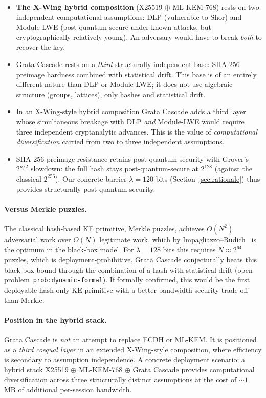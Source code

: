 \documentclass[11pt,a4paper]{article}
\begin{document}
\begin{itemize}[leftmargin=*]
\item \textbf{The X-Wing hybrid composition} (X25519 $\oplus$ ML-KEM-768) rests on two independent computational assumptions: DLP (vulnerable to Shor) and Module-LWE (post-quantum secure under known attacks, but cryptographically relatively young). An adversary would have to break \emph{both} to recover the key.
\item Grata Cascade rests on a \emph{third} structurally independent base: SHA-256 preimage hardness combined with statistical drift. This base is of an entirely different nature than DLP or Module-LWE; it does not use algebraic structure (groups, lattices), only hashes and statistical drift.
\item In an X-Wing-style hybrid composition Grata Cascade adds a third layer whose simultaneous breakage with DLP \emph{and} Module-LWE would require three independent cryptanalytic advances. This is the value of \emph{computational diversification} carried from two to three independent assumptions.
\item SHA-256 preimage resistance retains post-quantum security with Grover's $2^{n/2}$ slowdown: the full hash stays post-quantum-secure at $2^{128}$ (against the classical $2^{256}$). Our concrete barrier $\lambda = 120$ bits (Section~\ref{sec:rationale}) thus provides structurally post-quantum security.
\end{itemize}

\paragraph{Versus Merkle puzzles.} The classical hash-based KE primitive, Merkle puzzles, achieves $O(N^2)$ adversarial work over $O(N)$ legitimate work, which by Impagliazzo--Rudich~\cite{IR1989} is the optimum in the black-box model. For $\lambda = 128$ bits this requires $N \approx 2^{64}$ puzzles, which is deployment-prohibitive. Grata Cascade conjecturally beats this black-box bound through the combination of a hash with statistical drift (open problem~\texttt{prob:dynamic-formal}). If formally confirmed, this would be the first deployable hash-only KE primitive with a better bandwidth-security trade-off than Merkle.

\paragraph{Position in the hybrid stack.} Grata Cascade is \emph{not} an attempt to replace ECDH or ML-KEM. It is positioned as a \emph{third coequal layer} in an extended X-Wing-style composition, where efficiency is secondary to assumption independence. A concrete deployment scenario: a hybrid stack X25519 $\oplus$ ML-KEM-768 $\oplus$ Grata Cascade provides computational diversification across three structurally distinct assumptions at the cost of $\sim 1$ MB of additional per-session bandwidth.
\end{document}
